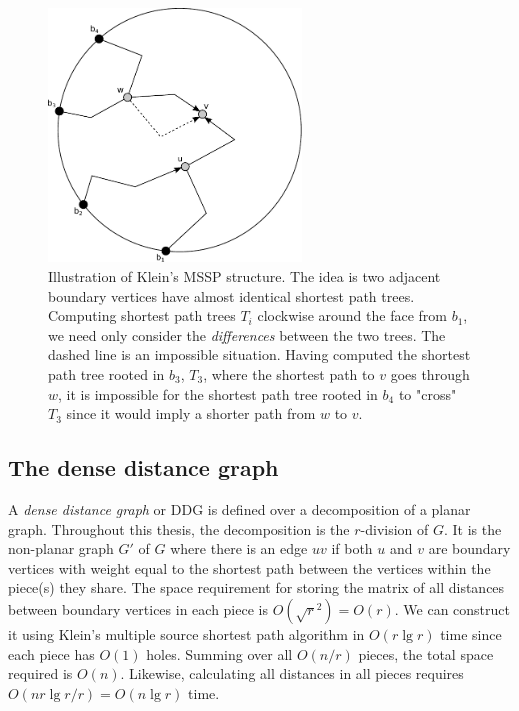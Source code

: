 \begin{figure}[h!]
  \centering
  \includegraphics[width=0.6\textwidth]{figs/klein.pdf}
  \caption{Illustration of Klein's MSSP structure. The idea is two adjacent boundary
    vertices have almost identical shortest path trees. Computing shortest path trees
    $T_i$ clockwise
    around the face from $b_1$, we need only consider the \textit{differences} between
  the two trees. The dashed line is an impossible situation. Having computed the shortest
path tree rooted in $b_3$, $T_3$, where the shortest path to $v$ goes through $w$, it is
impossible for the shortest path tree rooted in $b_4$ to "cross" $T_3$ since it would
imply a shorter path from $w$ to $v$.}
    \label{klein}
\end{figure}

\subsection{The dense distance graph}
A \textit{dense distance graph} or DDG is defined over a decomposition of a planar
graph. Throughout this thesis, the decomposition is the $r$-division of $G$. It is the non-planar graph $G'$ of $G$ where there is an edge $uv$ if both $u$ and
$v$ are boundary vertices with weight equal to the shortest path between the vertices within
the piece(s) they share. The space requirement for storing the matrix of all distances between boundary
vertices in each piece is $O(\sqrt{r}^2)=O(r)$. We can construct it using Klein's multiple source shortest
path algorithm in $O(r\lg r)$ time since each piece has $O(1)$ holes.
Summing over all $O(n/r)$ pieces, the total space required is $O(n)$. Likewise, calculating all
distances in all pieces requires $O(nr\lg r/r)=O(n\lg r)$ time.

